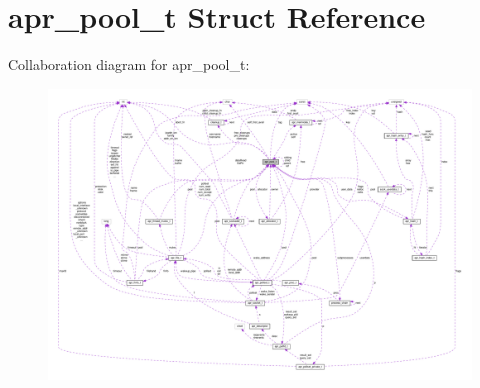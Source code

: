 \hypertarget{structapr__pool__t}{}\section{apr\+\_\+pool\+\_\+t Struct Reference}
\label{structapr__pool__t}


Collaboration diagram for apr\+\_\+pool\+\_\+t\+:
\nopagebreak
\begin{figure}[H]
\begin{center}
\leavevmode
\includegraphics[width=350pt]{structapr__pool__t__coll__graph}
\end{center}
\end{figure}
